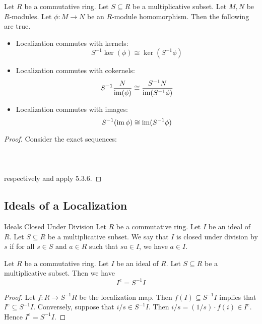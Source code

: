 \documentclass[a4paper]{article}
\begin{document}
\begin{lmm}{}{} Let $R$ be a commutative ring. Let $S\subseteq R$ be a multiplicative subset. Let $M,N$ be $R$-modules. Let $\phi:M\to N$ be an $R$-module homomorphism. Then the following are true. 
\begin{itemize}
\item Localization commutes with kernels: $$S^{-1}\ker(\phi)\cong\ker(S^{-1}\phi)$$
\item Localization commutes with cokernels: $$S^{-1}\frac{N}{\operatorname{im}(\phi)}\cong\frac{S^{-1}N}{\operatorname{im}(S^{-1}\phi)}$$
\item Localization commutes with images: $$S^{-1}(\operatorname{im}\phi)\cong\operatorname{im}(S^{-1}\phi)$$
\end{itemize} \tcbline
\begin{proof}
Consider the exact sequences: \\~\\
\\~\\
respectively and apply 5.3.6. 
\end{proof}
\end{lmm}

\subsection{Ideals of a Localization}
\begin{defn}{Ideals Closed Under Division}{} Let $R$ be a commutative ring. Let $I$ be an ideal of $R$. Let $S\subseteq R$ be a multiplicative subset. We say that $I$ is closed under division by $s$ if for all $s\in S$ and $a\in R$ such that $sa\in I$, we have $a\in I$. 
\end{defn}

\begin{lmm}{}{} Let $R$ be a commutative ring. Let $I$ be an ideal of $R$. Let $S\subseteq R$ be a multiplicative subset. Then we have $$I^e=S^{-1}I$$ \tcbline
\begin{proof}
Let $f:R\to S^{-1}R$ be the localization map. Then $f(I)\subseteq S^{-1}I$ implies that $I^e\subseteq S^{-1}I$. Conversely, suppose that $i/s\in S^{-1}I$. Then $i/s=(1/s)\cdot f(i)\in I^e$. Hence $I^e=S^{-1}I$. 
\end{proof}
\end{lmm}
\end{document}
